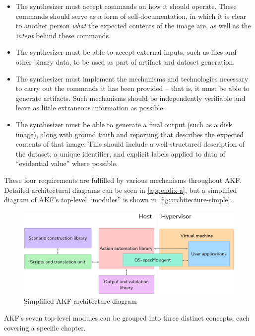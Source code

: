 \documentclass[letterpaper,12pt]{report}
\def\tightlist{}
\begin{document}
\begin{itemize}
\tightlist
\item
  The synthesizer must accept commands on how it should operate. These
  commands should serve as a form of self-documentation, in which it is
  clear to another person \emph{what} the expected contents of the image
  are, as well as the \emph{intent} behind these commands.
\item
  The synthesizer must be able to accept external inputs, such as files
  and other binary data, to be used as part of artifact and dataset
  generation.
\item
  The synthesizer must implement the mechanisms and technologies
  necessary to carry out the commands it has been provided -- that is,
  it must be able to generate artifacts. Such mechanisms should be
  independently verifiable and leave as little extraneous information as
  possible.
\item
  The synthesizer must be able to generate a final output (such as a
  disk image), along with ground truth and reporting that describes the
  expected contents of that image. This should include a well-structured
  description of the dataset, a unique identifier, and explicit labels
  applied to data of ``evidential value'' where possible.
\end{itemize}

These four requirements are fulfilled by various mechanisms throughout
AKF. Detailed architectural diagrams can be seen in \autoref{appendix-a}, but a simplified diagram of AKF's top-level
``modules'' is shown in \autoref{fig:architecture-simple}.

\begin{figure}[h]
\centering
\includegraphics[width=1\linewidth]{architecture-simple.png}
\caption{Simplified AKF architecture
diagram}\label{fig:architecture-simple}
\end{figure}

AKF's seven top-level modules can be grouped into three distinct
concepts, each covering a specific chapter.
\end{document}
